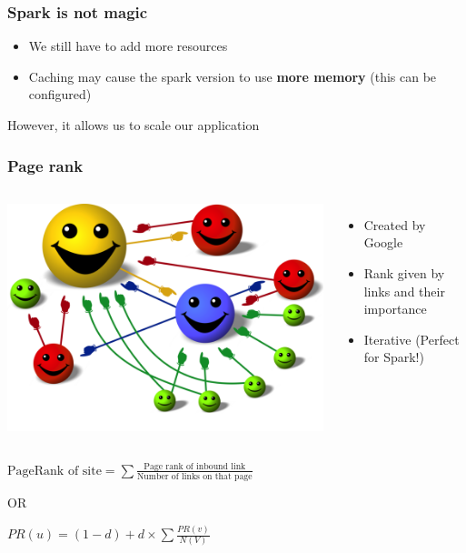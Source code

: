 \documentclass{beamer}
\begin{document}
\begin{frame}
  \frametitle{Spark is not magic}
  \begin{itemize}
    \item We still have to add more resources
    \item Caching may cause the spark version to use \textbf{more memory} (this can be configured)
  \end{itemize}
  \center
  \pause
  \huge{However, it allows us to scale our application}

\end{frame}



\begin{frame}[fragile]
  \frametitle{Page rank}

  \begin{columns}
    \includegraphics[width=\textwidth]{images/pagerank.png}
    \begin{itemize}
    \item Created by Google
    \item Rank given by links and their importance
    \item Iterative (Perfect for Spark!)
    \end{itemize}
  \end{columns}
  \begin{centering}

$
 \text{PageRank of site} = \sum \frac{\text{Page rank of inbound link}}{\text{Number of links on that page}}
$

OR

$
 PR(u) = (1-d)+d\times \sum \frac{PR(v)}{N(V)}
$

\end{centering}
\end{frame}
\end{document}
